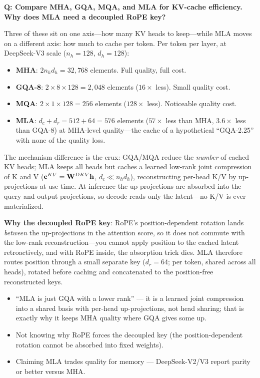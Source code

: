 \begin{interviewq}
\textbf{Q: Compare MHA, GQA, MQA, and MLA for KV-cache efficiency. Why does MLA need a decoupled RoPE key?}

 \quad {} \quad \badgefreq{\freqhigh}

\stronganswer Three of these sit on one axis---how many KV heads to keep---while MLA moves on a different axis: how much to cache per token. Per token per layer, at DeepSeek-V3 scale ($n_h = 128$, $d_h = 128$):

\begin{itemize}
    \item \textbf{MHA}: $2 n_h d_h = 32{,}768$ elements. Full quality, full cost.
    \item \textbf{GQA-8}: $2 \times 8 \times 128 = 2{,}048$ elements ($16\times$ less). Small quality cost.
    \item \textbf{MQA}: $2 \times 1 \times 128 = 256$ elements ($128\times$ less). Noticeable quality cost.
    \item \textbf{MLA}: $d_c + d_r = 512 + 64 = 576$ elements ($57\times$ less than MHA, $3.6\times$ less than GQA-8) at MHA-level quality---the cache of a hypothetical ``GQA-2.25'' with none of the quality loss.
\end{itemize}

The mechanism difference is the crux: GQA/MQA reduce the \textit{number} of cached KV heads; MLA keeps all heads but caches a learned low-rank joint compression of K and V ($\mathbf{c}^{KV} = \mathbf{W}^{DKV} \mathbf{h}$, $d_c \ll n_h d_h$), reconstructing per-head K/V by up-projections at use time. At inference the up-projections are absorbed into the query and output projections, so decode reads only the latent---no K/V is ever materialized.

\textbf{Why the decoupled RoPE key}: RoPE's position-dependent rotation lands \textit{between} the up-projections in the attention score, so it does not commute with the low-rank reconstruction---you cannot apply position to the cached latent retroactively, and with RoPE inside, the absorption trick dies. MLA therefore routes position through a small separate key ($d_r = 64$; per token, shared across all heads), rotated before caching and concatenated to the position-free reconstructed keys.

\redflags
\begin{itemize}
    \item ``MLA is just GQA with a lower rank'' --- it is a learned joint compression into a shared basis with per-head up-projections, not head sharing; that is exactly why it keeps MHA quality where GQA gives some up.
    \item Not knowing why RoPE forces the decoupled key (the position-dependent rotation cannot be absorbed into fixed weights).
    \item Claiming MLA trades quality for memory --- DeepSeek-V2/V3 report parity or better versus MHA.
\end{itemize}


\end{interviewq}
